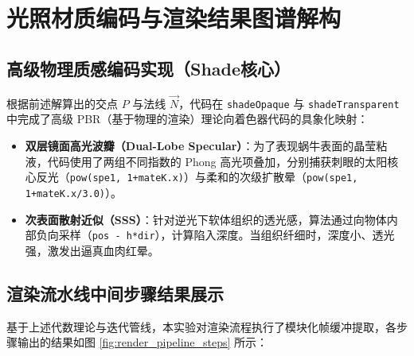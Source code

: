 \documentclass[11pt, a4paper, oneside]{report}
\newcommand{\keyword}[1]{\textbf{#1}}
\newcommand{\code}[1]{\texttt{#1}}
\begin{document}
\chapter{光照材质编码与渲染结果图谱解构}
\section{高级物理质感编码实现（Shade核心）}
根据前述解算出的交点 $P$ 与法线 $\vec{N}$，代码在 \code{shadeOpaque} 与 \code{shadeTransparent} 中完成了高级 PBR（基于物理的渲染）理论向着色器代码的具象化映射：
\begin{itemize}
    \item \keyword{双层镜面高光波瓣（Dual-Lobe Specular）}：为了表现蜗牛表面的晶莹粘液，代码使用了两组不同指数的 Phong 高光项叠加，分别捕获刺眼的太阳核心反光（\code{pow(spe1, 1+mateK.x)}）与柔和的次级扩散晕（\code{pow(spe1, 1+mateK.x/3.0)}）。
    \item \keyword{次表面散射近似（SSS）}：针对逆光下软体组织的透光感，算法通过向物体内部负向采样（\code{pos - h*dir}），计算陷入深度。当组织纤细时，深度小、透光强，激发出逼真血肉红晕。
\end{itemize}

\section{渲染流水线中间步骤结果展示}
基于上述代数理论与迭代管线，本实验对渲染流程执行了模块化帧缓冲提取，各步骤输出的结果如图 \ref{fig:render_pipeline_steps} 所示：
\end{document}

